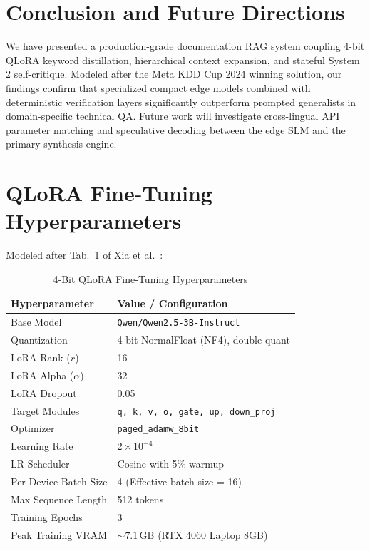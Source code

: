 \documentclass[sigconf,nonacm]{acmart}
\begin{document}
\section{Conclusion and Future Directions}
We have presented a production-grade documentation RAG system coupling 4-bit QLoRA keyword distillation, hierarchical context expansion, and stateful System 2 self-critique. Modeled after the Meta KDD Cup 2024 winning solution, our findings confirm that specialized compact edge models combined with deterministic verification layers significantly outperform prompted generalists in domain-specific technical QA. Future work will investigate cross-lingual API parameter matching and speculative decoding between the edge SLM and the primary synthesis engine.




\appendix
\section{QLoRA Fine-Tuning Hyperparameters}
Modeled after Tab.~1 of Xia et al.~\cite{kdd_winning}:

\begin{table}[h]
\centering
\caption{4-Bit QLoRA Fine-Tuning Hyperparameters}
\label{tab:qlora}
\small
\begin{tabular}{ll}
\toprule
\textbf{Hyperparameter} & \textbf{Value / Configuration} \\
\midrule
Base Model & \texttt{Qwen/Qwen2.5-3B-Instruct} \\
Quantization & 4-bit NormalFloat (NF4), double quant \\
LoRA Rank ($r$) & 16 \\
LoRA Alpha ($\alpha$) & 32 \\
LoRA Dropout & 0.05 \\
Target Modules & \texttt{q, k, v, o, gate, up, down\_proj} \\
Optimizer & \texttt{paged\_adamw\_8bit} \\
Learning Rate & $2 \times 10^{-4}$ \\
LR Scheduler & Cosine with 5\% warmup \\
Per-Device Batch Size & 4 (Effective batch size = 16) \\
Max Sequence Length & 512 tokens \\
Training Epochs & 3 \\
Peak Training VRAM & $\sim 7.1$\,GB (RTX 4060 Laptop 8GB) \\
\bottomrule
\end{tabular}
\end{table}
\end{document}
